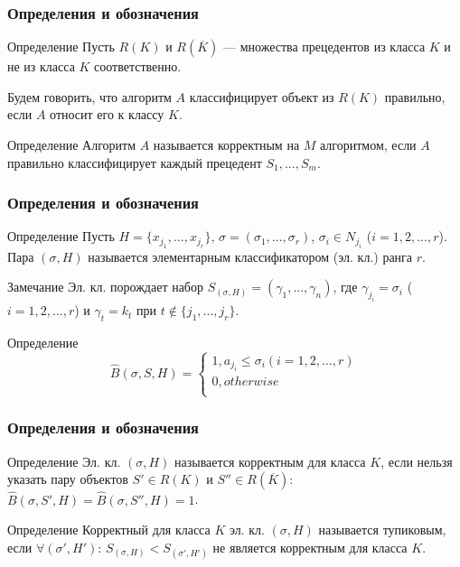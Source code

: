 \documentclass[
	11pt,
]{beamer}
\begin{document}
\begin{frame}
	\frametitle{Определения и обозначения}
	
	\begin{block}{Определение}
		Пусть $R(K)$ и $R(\overline{K})$ — множества прецедентов из класса $K$ и не из класса $K$ соответственно.

		Будем говорить, что алгоритм $A$ классифицирует объект из $R(K)$ правильно, если $A$ относит его к классу $K$.
	\end{block}

	\begin{block}{Определение}
		Алгоритм $A$ называется корректным на $M$ алгоритмом, если $A$ правильно классифицирует каждый прецедент $S_1, ..., S_m$.
	\end{block}

\end{frame}

\begin{frame}
	\frametitle{Определения и обозначения}
	
	\begin{block}{Определение}
		Пусть $H = \{x_{j_1}, ..., x_{j_r}\}$, $\sigma = (\sigma_1, ..., \sigma_r)$, $\sigma_i \in N_{j_i}$ ($i = 1, 2, ..., r$). Пара $(\sigma, H)$ называется элементарным классификатором (эл. кл.) ранга $r$.
	\end{block}

	\begin{exampleblock}{Замечание}
		Эл. кл. порождает набор $S_{(\sigma, H)} = (\gamma_1, ..., \gamma_n)$, где $\gamma_{j_i} = \sigma_i$ ($i = 1, 2, ..., r$) и $\gamma_t = k_t$ при $t \notin \{j_1, ..., j_r\}$.
	\end{exampleblock}

	\begin{block}{Определение}
		$$
		\hat{B}(\sigma, S, H)=
		\begin{cases}
		1, a_{j_i} \leq \sigma_i (i=1, 2, ..., r) \\
		0, otherwise \\
		\end{cases}
		$$
	\end{block}

\end{frame}

\begin{frame}
	\frametitle{Определения и обозначения}
	
	\begin{block}{Определение}
		Эл. кл. $(\sigma, H)$ называется корректным для класса $K$, если нельзя указать пару объектов $S' \in R(K)$ и $S'' \in R(\overline{K})$: $\hat{B}(\sigma, S', H) = \hat{B}(\sigma, S'', H) = 1$.
	\end{block}

	\begin{block}{Определение}
		Корректный для класса $K$ эл. кл. $(\sigma, H)$ называется тупиковым, если $\forall (\sigma', H')$: $S_{(\sigma, H)} < S_{(\sigma', H')}$ не является корректным для класса $K$. 
	\end{block}
\end{frame}
\end{document}
